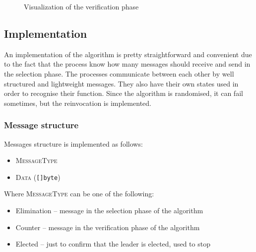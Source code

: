 \documentclass{article}
\begin{document}
\begin{figure}
\caption{Visualization of the verification phase}
\end{figure}

\subsection{Implementation}
An implementation of the algorithm is pretty straightforward and convenient due to the fact that the process know how many messages should receive and send in the selection phase. The processes communicate between each other by well structured and lightweight messages. They also have their own states used in order to recognise their function. Since the algorithm is randomised, it can fail sometimes, but the reinvocation is implemented.
\subsubsection{Message structure}
Messages structure is implemented as follows:
\begin{itemize}
    \item \textsc{MessageType} 
    \item \textsc{Data} (\texttt{[]byte})
\end{itemize}

Where \textsc{MessageType} can be one of the following:
\begin{itemize}
    \item Elimination -- message in the selection phase of the algorithm
    \item Counter -- message in the verification phase of the algorithm 
    \item Elected -- just to confirm that the leader is elected, used to stop 
\end{itemize}
\end{document}
